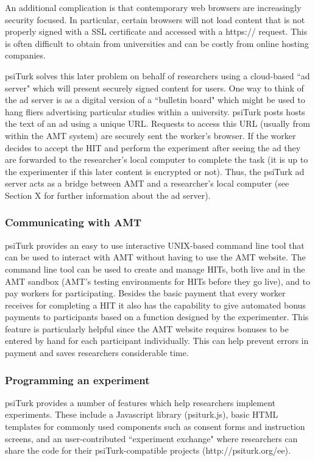\documentclass[twocolumn]{svjour3}          %
\begin{document}
An additional complication is that contemporary web browsers are increasingly security
focused.  In particular, certain browsers will not load content that is not properly 
signed with a SSL certificate and accessed with a \textsf{https://} request.  This
is often difficult to obtain from universities and can be costly from online
hosting companies.  

\textsf{psiTurk} solves this later problem on behalf of researchers
using a cloud-based ``ad server" which will present securely signed
content for users.  One way to think of the ad server is as a digital
version of a ``bulletin board" which might be used to hang fliers
advertising particular studies within a university.  \textsf{psiTurk}
posts hosts the text of an ad using a unique URL.  Requests to access
this URL (usually from within the AMT system) are securely sent
the worker's browser.  If the worker decides to accept the HIT and
perform the experiment after seeing the ad they are forwarded to
the researcher's local computer to complete the task (it is up to the
experimenter if this later content is encrypted or not). Thus, 
the \textsf{psiTurk} ad server acts as a bridge between AMT and 
a researcher's local computer (see Section X for further information 
about the ad server). 


\subsubsection{Communicating with AMT}

\textsf{psiTurk} provides an easy to use interactive UNIX-based command line tool that can be used to 
interact with AMT without having to use the AMT website.  
The command line tool can be used to create and manage HITs, both live and in the AMT sandbox 
(AMT's testing environments for HITs before they go live), and to pay workers for
participating. Besides the basic payment that every worker receives for completing a HIT
it also has the capability to give automated bonus payments to participants based on a function
designed by the experimenter. This feature is particularly helpful since the AMT website
requires bonuses to be entered by hand for each participant individually.
This can help prevent errors in payment and saves researchers considerable
time.


\subsubsection{Programming an experiment}
\textsf{psiTurk} provides a number of features which help researchers implement 
experiments.  These include a Javascript library (psiturk.js), basic HTML templates 
for commonly used components such as consent forms and instruction screens, 
and an user-contributed ``experiment exchange" where researchers can share the code for their \textsf{psiTurk}-compatible
projects (http://psiturk.org/ee). 
\end{document}
